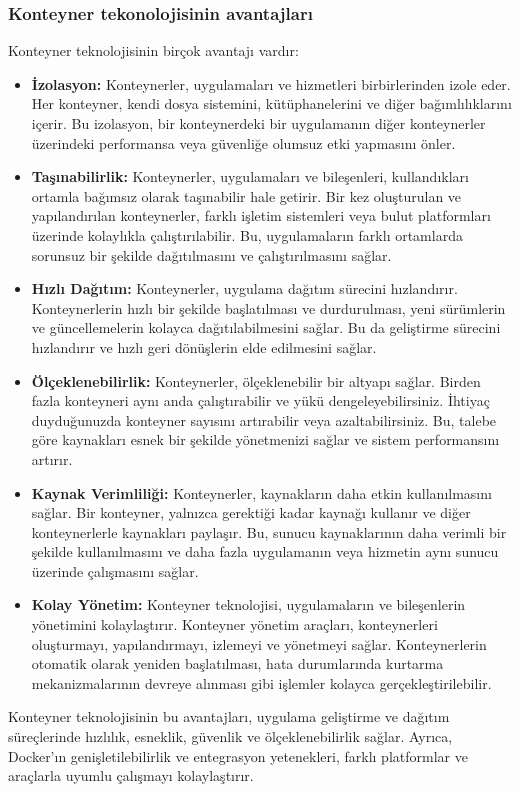 \subsubsection{Konteyner tekonolojisinin   avantajları }
Konteyner teknolojisinin birçok avantajı vardır:
\begin{itemize}
\item \textbf{İzolasyon:} Konteynerler, uygulamaları ve hizmetleri birbirlerinden izole eder. Her konteyner, kendi dosya sistemini, kütüphanelerini ve diğer bağımlılıklarını içerir. Bu izolasyon, bir konteynerdeki bir uygulamanın diğer konteynerler üzerindeki performansa veya güvenliğe olumsuz etki yapmasını önler.

\item \textbf{Taşınabilirlik:} Konteynerler, uygulamaları ve bileşenleri, kullandıkları ortamla bağımsız olarak taşınabilir hale getirir. Bir kez oluşturulan ve yapılandırılan konteynerler, farklı işletim sistemleri veya bulut platformları üzerinde kolaylıkla çalıştırılabilir. Bu, uygulamaların farklı ortamlarda sorunsuz bir şekilde dağıtılmasını ve çalıştırılmasını sağlar.

\item \textbf{Hızlı Dağıtım:} Konteynerler, uygulama dağıtım sürecini hızlandırır. Konteynerlerin hızlı bir şekilde başlatılması ve durdurulması, yeni sürümlerin ve güncellemelerin kolayca dağıtılabilmesini sağlar. Bu da geliştirme sürecini hızlandırır ve hızlı geri dönüşlerin elde edilmesini sağlar.

\item \textbf{Ölçeklenebilirlik:} Konteynerler, ölçeklenebilir bir altyapı sağlar. Birden fazla konteyneri aynı anda çalıştırabilir ve yükü dengeleyebilirsiniz. İhtiyaç duyduğunuzda konteyner sayısını artırabilir veya azaltabilirsiniz. Bu, talebe göre kaynakları esnek bir şekilde yönetmenizi sağlar ve sistem performansını artırır.

\item \textbf{Kaynak Verimliliği:} Konteynerler, kaynakların daha etkin kullanılmasını sağlar. Bir konteyner, yalnızca gerektiği kadar kaynağı kullanır ve diğer konteynerlerle kaynakları paylaşır. Bu, sunucu kaynaklarının daha verimli bir şekilde kullanılmasını ve daha fazla uygulamanın veya hizmetin aynı sunucu üzerinde çalışmasını sağlar.

\item \textbf{Kolay Yönetim:} Konteyner teknolojisi, uygulamaların ve bileşenlerin yönetimini kolaylaştırır. Konteyner yönetim araçları, konteynerleri oluşturmayı, yapılandırmayı, izlemeyi ve yönetmeyi sağlar. Konteynerlerin otomatik olarak yeniden başlatılması, hata durumlarında kurtarma mekanizmalarının devreye alınması gibi işlemler kolayca gerçekleştirilebilir.

\end{itemize}
Konteyner teknolojisinin bu avantajları, uygulama geliştirme ve dağıtım süreçlerinde hızlılık, esneklik, güvenlik ve ölçeklenebilirlik sağlar. Ayrıca, Docker'ın genişletilebilirlik ve entegrasyon yetenekleri, farklı platformlar ve araçlarla uyumlu çalışmayı kolaylaştırır.\\

